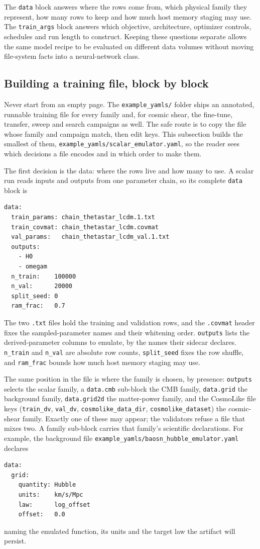 \documentclass[10pt,aps,prd,twocolumn,nofootinbib]{revtex4-2}
\newcommand{\code}[1]{\texttt{#1}}
\begin{document}
The \code{data} block answers where the rows come from, which physical family
they represent, how many rows to keep and how much host memory staging may
use.  The \code{train\_args} block answers which objective, architecture,
optimizer controls, schedules and run length to construct.  Keeping these
questions separate allows the same model recipe to be evaluated on different
data volumes without moving file-system facts into a neural-network class.

\subsection{Building a training file, block by block}

Never start from an empty page.  The \code{example\_yamls/} folder ships an
annotated, runnable training file for every family and, for cosmic shear,
the fine-tune, transfer, sweep and search campaigns as well.  The safe route
is to copy the file whose family and campaign match, then edit keys.  This
subsection builds the smallest of them,
\code{example\_yamls/scalar\_emulator.yaml}, so the reader sees which
decisions a file encodes and in which order to make them.

The first decision is the data: where the rows live and how many to use.  A
scalar run reads inputs and outputs from one parameter chain, so its complete
\code{data} block is
\begin{verbatim}
data:
  train_params: chain_thetastar_lcdm.1.txt
  train_covmat: chain_thetastar_lcdm.covmat
  val_params:   chain_thetastar_lcdm_val.1.txt
  outputs:
    - H0
    - omegam
  n_train:    100000
  n_val:      20000
  split_seed: 0
  ram_frac:   0.7
\end{verbatim}
The two \code{.txt} files hold the training and validation rows, and the
\code{.covmat} header fixes the sampled-parameter names and their whitening
order.  \code{outputs} lists the derived-parameter columns to emulate, by the
names their sidecar declares.  \code{n\_train} and \code{n\_val} are absolute
row counts, \code{split\_seed} fixes the row shuffle, and \code{ram\_frac}
bounds how much host memory staging may use.

The same position in the file is where the family is chosen, by presence:
\code{outputs} selects the scalar family, a \code{data.cmb} sub-block the CMB
family, \code{data.grid} the background family, \code{data.grid2d} the
matter-power family, and the CosmoLike file keys (\code{train\_dv},
\code{val\_dv}, \code{cosmolike\_data\_dir}, \code{cosmolike\_dataset}) the
cosmic-shear family.  Exactly one of these may appear; the validators refuse a
file that mixes two.  A family sub-block carries that family's scientific
declarations.  For example, the background file
\code{example\_yamls/baosn\_hubble\_emulator.yaml} declares
\begin{verbatim}
data:
  grid:
    quantity: Hubble
    units:    km/s/Mpc
    law:      log_offset
    offset:   0.0
\end{verbatim}
naming the emulated function, its units and the target law the artifact will
persist.
\end{document}
